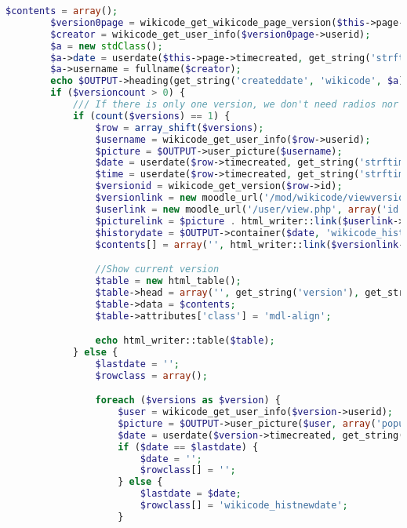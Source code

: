 \begin{lstlisting}[language=PHP]
        $contents = array();
        $version0page = wikicode_get_wikicode_page_version($this->page->id, 0);
        $creator = wikicode_get_user_info($version0page->userid);
        $a = new stdClass();
        $a->date = userdate($this->page->timecreated, get_string('strftimedaydatetime', 'langconfig'));
        $a->username = fullname($creator);
        echo $OUTPUT->heading(get_string('createddate', 'wikicode', $a), 4, 'wikicode_headingtime');
        if ($versioncount > 0) {
            /// If there is only one version, we don't need radios nor forms
            if (count($versions) == 1) {
                $row = array_shift($versions);
                $username = wikicode_get_user_info($row->userid);
                $picture = $OUTPUT->user_picture($username);
                $date = userdate($row->timecreated, get_string('strftimedate', 'langconfig'));
                $time = userdate($row->timecreated, get_string('strftimetime', 'langconfig'));
                $versionid = wikicode_get_version($row->id);
                $versionlink = new moodle_url('/mod/wikicode/viewversion.php', array('pageid' => $pageid, 'versionid' => $versionid->id));
                $userlink = new moodle_url('/user/view.php', array('id' => $username->id));
                $picturelink = $picture . html_writer::link($userlink->out(false), fullname($username));
                $historydate = $OUTPUT->container($date, 'wikicode_histdate');
                $contents[] = array('', html_writer::link($versionlink->out(false), $row->version), $picturelink, $time, $historydate);

                //Show current version
                $table = new html_table();
                $table->head = array('', get_string('version'), get_string('user'), get_string('modified'), '');
                $table->data = $contents;
                $table->attributes['class'] = 'mdl-align';

                echo html_writer::table($table);
            } else {
                $lastdate = '';
                $rowclass = array();

                foreach ($versions as $version) {
                    $user = wikicode_get_user_info($version->userid);
                    $picture = $OUTPUT->user_picture($user, array('popup' => true));
                    $date = userdate($version->timecreated, get_string('strftimedate'));
                    if ($date == $lastdate) {
                        $date = '';
                        $rowclass[] = '';
                    } else {
                        $lastdate = $date;
                        $rowclass[] = 'wikicode_histnewdate';
                    }


\end{lstlisting}
